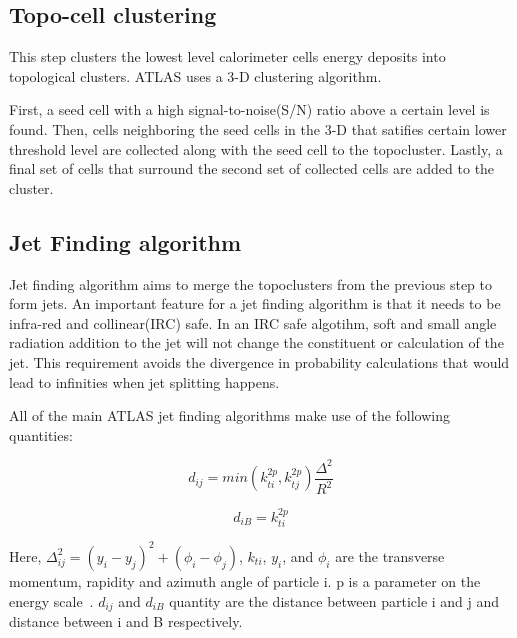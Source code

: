 % 
\subsection*{Topo-cell clustering}
\label{Topocell clustering}
This step clusters the lowest level calorimeter cells energy deposits into topological clusters. ATLAS uses a 3-D clustering algorithm. 

First, a seed cell with a high signal-to-noise(S/N) ratio above a certain level is found. Then, cells neighboring the seed cells in the 3-D that satifies certain lower threshold level are collected along with the seed cell to the topocluster. Lastly, a final set of cells that surround the second set of collected cells are added to the cluster. 

\subsection*{Jet Finding algorithm}
\label{sec:JetFinding}

Jet finding algorithm aims to merge the topoclusters from the previous step to form jets. An important feature for a jet finding algorithm is that it needs to be infra-red and collinear(IRC) safe. In an IRC safe algotihm, soft and small angle radiation addition to the jet will not change the constituent or calculation of the jet. This requirement avoids the divergence in probability calculations that would lead to infinities when jet splitting happens.

All of the main ATLAS jet finding algorithms make use of the following quantities:

\begin{equation}
    d_{ij} = min(k_{ti}^{2p}, k_{tj}^{2p}) \frac{\Delta^{2}}{R^{2}}
    \label{sec:topo}
\end{equation}

\begin{equation}
    d_{iB} = k^{2p}_{ti}
\end{equation}

Here, $\Delta_{ij}^{2} = (y_{i}- y_{j})^2 + (\phi_{i} - \phi_{j})$, $k_{ti}
$, $y_{i}$, and $\phi_{i}$ are the transverse momentum, rapidity and azimuth angle of particle i. p is a parameter on the energy scale~\cite{HEP2008}. $d_{ij}$ and $d_{iB}$ quantity are the distance between particle i and j and distance between i and B respectively. 

